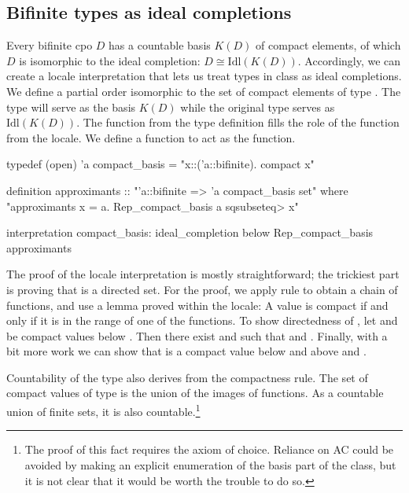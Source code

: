 \subsection{Bifinite types as ideal completions}

Every bifinite cpo $D$ has a countable basis $K(D)$ of compact elements, of which $D$ is isomorphic to the ideal completion: $D \cong \mathrm{Idl}(K(D))$. Accordingly, we can create a locale interpretation that lets us treat types in class  as ideal completions. We define a partial order  isomorphic to the set of compact elements of type . The type  will serve as the basis $K(D)$ while the original type  serves as $\mathrm{Idl}(K(D))$. The  function from the type definition fills the role of the function  from the  locale. We define a function  to act as the  function.
%
\begin{isacode}
typedef (open) 'a compact_basis = "{x::('a::bifinite). compact x}"
\end{isacode}
\unmedskip
{}
\begin{isacode}
definition approximants :: "'a::bifinite => 'a compact_basis set"
  where "approximants x = {a. Rep_compact_basis a \<sqsubseteq> x}"
\end{isacode}
\unmedskip
\begin{isacode}
interpretation compact_basis:
  ideal_completion below Rep_compact_basis approximants
\end{isacode}
%
The proof of the locale interpretation is mostly straightforward; the trickiest part is proving that  is a directed set. For the proof, we apply rule  to obtain a chain of  functions, and use a lemma proved within the  locale: A value is compact if and only if it is in the range of one of the  functions. To show directedness of , let  and  be compact values below . Then there exist  and  such that  and  . Finally, with a bit more work we can show that  is a compact value below  and above  and .

Countability of the type  also derives from the compactness rule. The set of compact values of type  is the union of the images of  functions. As a countable union of finite sets, it is also countable.\footnote{The proof of this fact requires the axiom of choice. Reliance on AC could be avoided by making an explicit enumeration of the basis part of the  class, but it is not clear that it would be worth the trouble to do so.}

